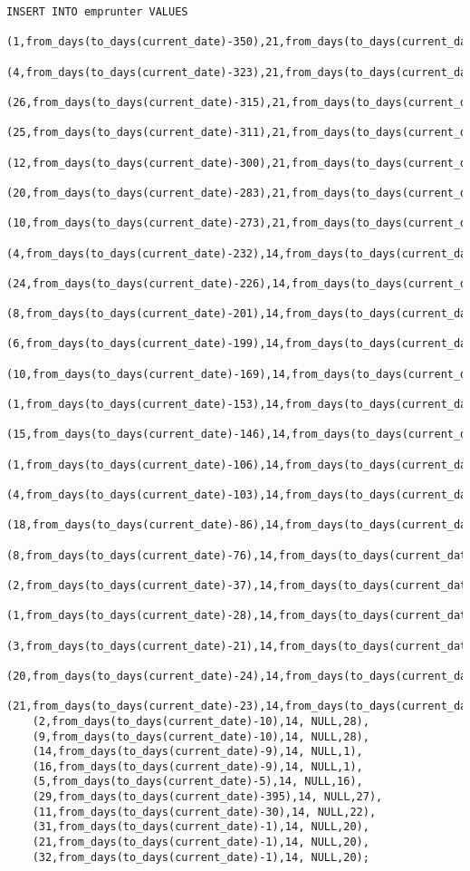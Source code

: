 \documentclass[11]{article}
\begin{document}
\newpage
\begin{verbatim}
INSERT INTO emprunter VALUES
	(1,from_days(to_days(current_date)-350),21,from_days(to_days(current_date)-349),26),
	(4,from_days(to_days(current_date)-323),21,from_days(to_days(current_date)-310),4),
	(26,from_days(to_days(current_date)-315),21,from_days(to_days(current_date)-318),9),
	(25,from_days(to_days(current_date)-311),21,from_days(to_days(current_date)-293),1),
	(12,from_days(to_days(current_date)-300),21,from_days(to_days(current_date)-1290),7),
	(20,from_days(to_days(current_date)-283),21,from_days(to_days(current_date)-282),27),
	(10,from_days(to_days(current_date)-273),21,from_days(to_days(current_date)-250),7),
	(4,from_days(to_days(current_date)-232),14,from_days(to_days(current_date)-228),12),
	(24,from_days(to_days(current_date)-226),14,from_days(to_days(current_date)-220),26),
	(8,from_days(to_days(current_date)-201),14,from_days(to_days(current_date)-183),13),
	(6,from_days(to_days(current_date)-199),14,from_days(to_days(current_date)-194),3),
	(10,from_days(to_days(current_date)-169),14,from_days(to_days(current_date)-157),8),
	(1,from_days(to_days(current_date)-153),14,from_days(to_days(current_date)-142),3),
	(15,from_days(to_days(current_date)-146),14,from_days(to_days(current_date)-138),10),
	(1,from_days(to_days(current_date)-106),14,from_days(to_days(current_date)-101),2),
	(4,from_days(to_days(current_date)-103),14,from_days(to_days(current_date)-93),5),
	(18,from_days(to_days(current_date)-86),14,from_days(to_days(current_date)-79),3),
	(8,from_days(to_days(current_date)-76),14,from_days(to_days(current_date)-70),18),
	(2,from_days(to_days(current_date)-37),14,from_days(to_days(current_date)-28),4),
	(1,from_days(to_days(current_date)-28),14,from_days(to_days(current_date)-23),1),
	(3,from_days(to_days(current_date)-21),14,from_days(to_days(current_date)-17),3),
	(20,from_days(to_days(current_date)-24),14,from_days(to_days(current_date)-8),9),
	(21,from_days(to_days(current_date)-23),14,from_days(to_days(current_date)-11),14),
	(2,from_days(to_days(current_date)-10),14, NULL,28),
	(9,from_days(to_days(current_date)-10),14, NULL,28),
	(14,from_days(to_days(current_date)-9),14, NULL,1),
	(16,from_days(to_days(current_date)-9),14, NULL,1),
	(5,from_days(to_days(current_date)-5),14, NULL,16),
	(29,from_days(to_days(current_date)-395),14, NULL,27),
	(11,from_days(to_days(current_date)-30),14, NULL,22),
	(31,from_days(to_days(current_date)-1),14, NULL,20),
	(21,from_days(to_days(current_date)-1),14, NULL,20),
	(32,from_days(to_days(current_date)-1),14, NULL,20);
\end{verbatim}
\end{document}
